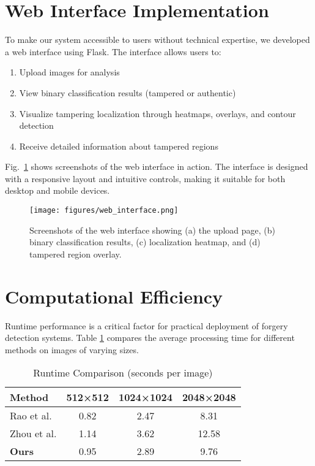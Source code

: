 \documentclass[conference]{IEEEtran}
\begin{document}
\section{Web Interface Implementation}
To make our system accessible to users without technical expertise, we developed a web interface using Flask. The interface allows users to:

\begin{enumerate}
    \item Upload images for analysis
    \item View binary classification results (tampered or authentic)
    \item Visualize tampering localization through heatmaps, overlays, and contour detection
    \item Receive detailed information about tampered regions
\end{enumerate}

Fig.~\ref{fig:web_interface} shows screenshots of the web interface in action. The interface is designed with a responsive layout and intuitive controls, making it suitable for both desktop and mobile devices.

\begin{figure}[htbp]
\centerline{\texttt{[image: figures/web\_interface.png]}}
\caption{Screenshots of the web interface showing (a) the upload page, (b) binary classification results, (c) localization heatmap, and (d) tampered region overlay.}
\label{fig:web_interface}
\end{figure}

\section{Computational Efficiency}
Runtime performance is a critical factor for practical deployment of forgery detection systems. Table \ref{tab:runtime} compares the average processing time for different methods on images of varying sizes.

\begin{table}[htbp]
\caption{Runtime Comparison (seconds per image)}
\begin{center}
\begin{tabular}{|l|c|c|c|}
\hline
\textbf{Method} & \textbf{512×512} & \textbf{1024×1024} & \textbf{2048×2048} \\
\hline
Rao et al. \cite{rao2016} & 0.82 & 2.47 & 8.31 \\
\hline
Zhou et al. \cite{zhou2018} & 1.14 & 3.62 & 12.58 \\
\hline
\textbf{Ours} & 0.95 & 2.89 & 9.76 \\
\hline
\end{tabular}
\label{tab:runtime}
\end{center}
\end{table}
\end{document}
